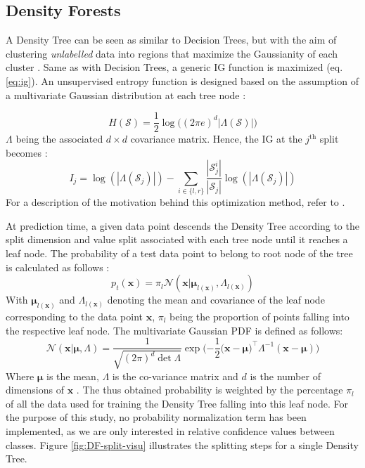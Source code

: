 \documentclass[10pt]{article}
\begin{document}
\subsection{Density Forests}

A Density Tree can be seen as similar to Decision Trees, but with the aim of clustering \textit{unlabelled} data into regions that maximize the Gaussianity of each cluster \cite{CW2017}. Same as with Decision Trees, a generic \acrlong{IG} function is maximized (eq. \ref{eq:ig}). An unsupervised entropy function is designed based on the assumption of a multivariate Gaussian distribution at each tree node \cite{decisionForests-MSR}:

\begin{equation}
    H(\mathcal{S}) = \frac{1}{2}\log\Big((2\pi e)^d|\mathtt{\Lambda}(\mathcal{S})|\Big)
\end{equation}
$\mathtt{\Lambda}$ being the associated $d \times d$ covariance matrix. Hence, the \acrlong{IG} at the $j^{\text{th}}$ split becomes \cite{decisionForests-MSR}:
\begin{equation}
    I_j = \log(|\mathtt{\Lambda}(\mathcal{S}_j)|) - \sum_{i\in \{l, r\}}\frac{|\mathcal{S}_j^i|}{|\mathcal{S}_j|}\log(|\mathtt{\Lambda}(\mathcal{S}_j)|)
\end{equation}
For a description of the motivation behind this optimization method, refer to \textcite{decisionForests-MSR}.

At prediction time, a given data point descends the Density Tree according to the split dimension and value split associated with each tree node until it reaches a leaf node. The probability of a test data point to belong to root node of the tree is calculated as follows \cite{decisionForests-MSR}:
\begin{equation}
    \label{eq:proba_density}
    p_t(\mathbf{x}) = \pi_l\mathcal{N}(\mathbf{x}|\boldsymbol{\mu}_{l(\mathbf{x})},\mathtt{\Lambda}_{l(\mathbf{x})})
\end{equation}
With $\boldsymbol{\mu}_{l(\mathbf{x})}$ and $\mathtt{\Lambda}_{l(\mathbf{x})}$ denoting the mean and covariance of the leaf node corresponding to the data point $\mathbf{x}$, $\pi_l$ being the proportion of points falling into the respective leaf node. The multivariate Gaussian \gls{PDF} is defined as follows:
\begin{equation}
    \label{eq:mv-gaussian}
    \mathcal{N}(\mathbf{x}|\boldsymbol{\mu},\mathtt{\Lambda})=\frac{1}{\sqrt{(2\pi)^d\det\mathtt{\Lambda}}}\exp\Big({-\frac{1}{2}(\mathbf{x}-\boldsymbol{\mu}})^\top\mathtt{\Lambda}^{-1}(\mathbf{x}-\boldsymbol{\mu})\Big)
\end{equation}
Where $\boldsymbol{\mu}$ is the mean, $\mathtt{\Lambda}$ is the co-variance matrix and $d$ is the number of dimensions of $\mathbf{x}$ \cite{scipy}. The thus obtained probability is weighted by the percentage $\pi_l$ of all the data used for training the Density Tree falling into this leaf node. For the purpose of this study, no probability normalization term has been implemented, as we are only interested in relative confidence values between classes. Figure \ref{fig:DF-split-visu} illustrates the splitting steps for a single Density Tree. 
\end{document}
